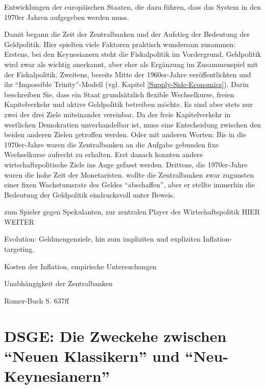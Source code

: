 Entwicklungen der europäischen Staaten, die dazu führen, dass das System in den 1970er Jahren aufgegeben werden muss.

Damit begann die Zeit der Zentralbanken und der Aufstieg der Bedeutung der Geldpolitik. Hier spielten viele Faktoren praktisch wundersam zusammen: Erstens, bei den Keynesianern steht die Fiskalpolitik im Vordergrund, Geldpolitik wird zwar als wichtig anerkannt, aber eher als Ergänzung im Zusammenspiel mit der Fiskalpolitik. Zweitens, bereits Mitte der 1960er-Jahre veröffentlichten \textcite{Mundell1963} und \textcite{Fleming1962} ihr "`Impossible Trinity"'-Modell (vgl. Kapitel \ref{Supply-Side-Economics}). Darin beschreiben Sie, dass ein Staat grundsätzlich flexible Wechselkurse, freien Kapitelverkehr und aktive Geldpolitik betreiben möchte. Es sind aber stets nur zwei der drei Ziele miteinander vereinbar. Da der freie Kapitelverkehr in westlichen Demokratien unverhandelbar ist, muss eine Entscheidung zwischen den beiden anderen Zielen getroffen werden. Oder mit anderen Worten: Bis in die 1970er-Jahre waren die Zentralbanken an die Aufgabe gebunden fixe Wechselkurse aufrecht zu erhalten. Erst danach konnten andere wirtschaftspolitische Ziele ins Auge gefasst werden. Drittens, die 1970er-Jahre waren die hohe Zeit der Monetaristen. \textcite{Friedman1968, Friedman1976b} wollte die Zentralbanken zwar zugunsten einer fixen Wachstumsrate des Geldes "`abschaffen"', aber er stellte immerhin die Bedeutung der Geldpolitik eindrucksvoll unter Beweis. 


zum Spieler gegen Spekulanten, zur zentralen Player der Wirtschaftspolitik
HIER WEITER


Evolution: Geldmengenziele, hin zum impliziten und expliziten Inflation-targeting.

Kosten der Inflation, empirische Untersuchungen

Unabhängigkeit der Zentralbanken

Romer-Buch S. 637ff


\section{DSGE: Die Zweckehe zwischen "`Neuen Klassikern"' und "`Neu-Keynesianern"'}

